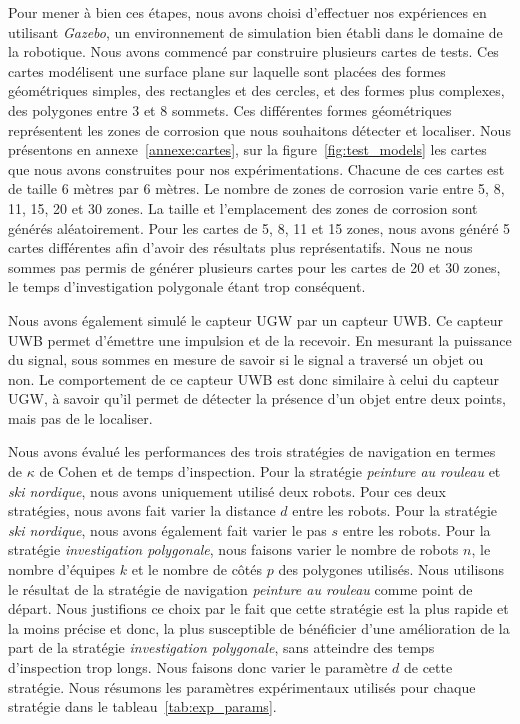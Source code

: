\documentclass[francais,RandD]{rapportPFE}
\begin{document}
		Pour mener à bien ces étapes, nous avons choisi d'effectuer nos expériences en utilisant \textit{Gazebo}, un environnement de simulation bien établi dans le domaine de la robotique.
		Nous avons commencé par construire plusieurs cartes de tests.
		Ces cartes modélisent une surface plane sur laquelle sont placées des formes géométriques simples, des rectangles et des cercles, et des formes plus complexes, des polygones entre 3 et 8 sommets.
		Ces différentes formes géométriques représentent les zones de corrosion que nous souhaitons détecter et localiser.
		Nous présentons en annexe~\ref{annexe:cartes}, sur la figure~\ref{fig:test_models} les cartes que nous avons construites pour nos expérimentations.
		Chacune de ces cartes est de taille 6 mètres par 6 mètres.
		Le nombre de zones de corrosion varie entre 5, 8, 11, 15, 20 et 30 zones.
		La taille et l'emplacement des zones de corrosion sont générés aléatoirement.
		Pour les cartes de 5, 8, 11 et 15 zones, nous avons généré 5 cartes différentes afin d'avoir des résultats plus représentatifs.
		Nous ne nous sommes pas permis de générer plusieurs cartes pour les cartes de 20 et 30 zones, le temps d'investigation polygonale étant trop conséquent.

		Nous avons également simulé le capteur UGW par un capteur UWB.
		Ce capteur UWB permet d'émettre une impulsion et de la recevoir.
		En mesurant la puissance du signal, sous sommes en mesure de savoir si le signal a traversé un objet ou non.
		Le comportement de ce capteur UWB est donc similaire à celui du capteur UGW, à savoir qu'il permet de détecter la présence d'un objet entre deux points, mais pas de le localiser.

		Nous avons évalué les performances des trois stratégies de navigation en termes de $\kappa$ de Cohen et de temps d'inspection.
		Pour la stratégie \textit{peinture au rouleau} et \textit{ski nordique}, nous avons uniquement utilisé deux robots.
		Pour ces deux stratégies, nous avons fait varier la distance $d$ entre les robots.
		Pour la stratégie \textit{ski nordique}, nous avons également fait varier le pas $s$ entre les robots.
		Pour la stratégie \textit{investigation polygonale}, nous faisons varier le nombre de robots $n$, le nombre d'équipes $k$ et le nombre de côtés $p$ des polygones utilisés.
		Nous utilisons le résultat de la stratégie de navigation \textit{peinture au rouleau} comme point de départ.
		Nous justifions ce choix par le fait que cette stratégie est la plus rapide et la moins précise et donc, la plus susceptible de bénéficier d'une amélioration de la part de la stratégie \textit{investigation polygonale}, sans atteindre des temps d'inspection trop longs.
		Nous faisons donc varier le paramètre $d$ de cette stratégie.
		Nous résumons les paramètres expérimentaux utilisés pour chaque stratégie dans le tableau~\ref{tab:exp_params}.
\end{document}
